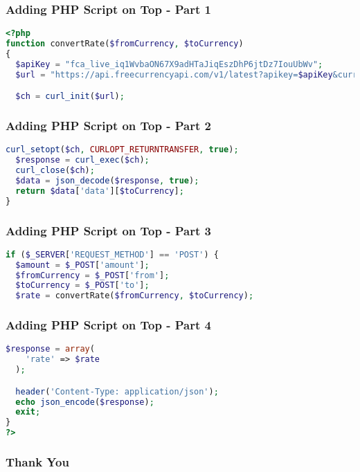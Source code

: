 \documentclass[aspectratio=169, table]{beamer}
\begin{document}
\begin{frame}[fragile]
    \frametitle{Adding PHP Script on Top - Part 1}
    \begin{lstlisting}[language=PHP]
<?php
function convertRate($fromCurrency, $toCurrency)
{
  $apiKey = "fca_live_iq1WvbaON67X9adHTaJiqEszDhP6jtDz7IouUbWv";
  $url = "https://api.freecurrencyapi.com/v1/latest?apikey=$apiKey&currencies=$toCurrency&base_currency=$fromCurrency";

  $ch = curl_init($url);
    \end{lstlisting}
\end{frame}

\begin{frame}[fragile]
    \frametitle{Adding PHP Script on Top - Part 2}
    \begin{lstlisting}[language=PHP]
  curl_setopt($ch, CURLOPT_RETURNTRANSFER, true);
  $response = curl_exec($ch);
  curl_close($ch);
  $data = json_decode($response, true);
  return $data['data'][$toCurrency];
}
    \end{lstlisting}
\end{frame}

\begin{frame}[fragile]
    \frametitle{Adding PHP Script on Top - Part 3}
    \begin{lstlisting}[language=PHP]
if ($_SERVER['REQUEST_METHOD'] == 'POST') {
  $amount = $_POST['amount'];
  $fromCurrency = $_POST['from'];
  $toCurrency = $_POST['to'];
  $rate = convertRate($fromCurrency, $toCurrency);
    \end{lstlisting}
\end{frame}

\begin{frame}[fragile]
    \frametitle{Adding PHP Script on Top - Part 4}
    \begin{lstlisting}[language=PHP]
$response = array(
    'rate' => $rate
  );

  header('Content-Type: application/json');
  echo json_encode($response);
  exit;
}
?>
    \end{lstlisting}
\end{frame}

\begin{frame4}
    \frametitle{Thank You}
\end{frame4}
\end{document}
